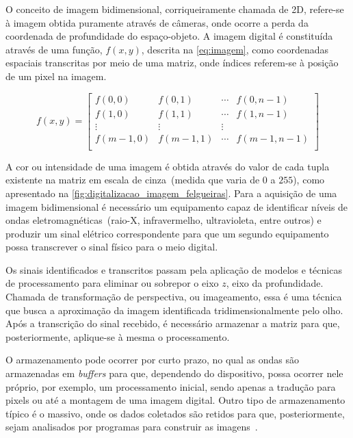 \documentclass[12pt,oneside,a4paper,chapter=TITLE,section=TITLE,sumario=tradicional]{abntex2}
\begin{document}
O conceito de imagem bidimensional, corriqueiramente chamada de 2D, refere-se à imagem obtida puramente através de câmeras, onde ocorre a perda da coordenada de profundidade do espaço-objeto. A imagem digital é constituída através de uma função, $f(x,y)$, descrita na \autoref{eq:imagem}, como coordenadas espaciais transcritas por meio de uma matriz, onde índices referem-se à posição de um pixel na imagem.

\begin{equation}
\label{eq:imagem}
f(x,y) = 
\begin{bmatrix}
f(0,0) & f(0,1) & \cdots & f(0, n-1)\\
f(1,0) & f(1,1) & \cdots & f(1, n-1) \\
\vdots & \vdots & \vdots & \\
f(m-1,0) & f(m-1, 1) & \cdots & f(m-1, n-1)\\
\end{bmatrix}
\end{equation}

A cor ou intensidade de uma imagem é obtida através do valor de cada tupla existente na matriz em escala de cinza~(medida que varia de $0$ a $255$), como apresentado na \autoref{fig:digitalizacao_imagem_felgueiras}. Para a aquisição de uma imagem bidimensional é necessário um equipamento capaz de identificar níveis de ondas eletromagnéticas~(raio-X, infravermelho, ultravioleta, entre outros) e produzir um sinal elétrico correspondente para que um segundo equipamento possa transcrever o sinal físico para o meio digital.

\begin{figure}[htb]
\end{figure}

Os sinais identificados e transcritos passam pela aplicação de modelos e técnicas de processamento para eliminar ou sobrepor o eixo $z$, eixo da profundidade. Chamada de transformação de perspectiva, ou imageamento, essa é uma técnica que busca a aproximação da imagem identificada tridimensionalmente pelo olho.
Após a transcrição do sinal recebido, é necessário armazenar a matriz para que, posteriormente, aplique-se à mesma o processamento.

\newpage

O armazenamento pode ocorrer por curto prazo, no qual as ondas são armazenadas em \textit{buffers} para que, dependendo do dispositivo, possa ocorrer nele próprio, por exemplo, um processamento inicial, sendo apenas a tradução para pixels ou até a montagem de uma imagem digital. Outro tipo de armazenamento típico é o massivo, onde os dados coletados são retidos para que, posteriormente, sejam analisados por programas para construir as imagens~\cite{pdi2006}.
\end{document}
